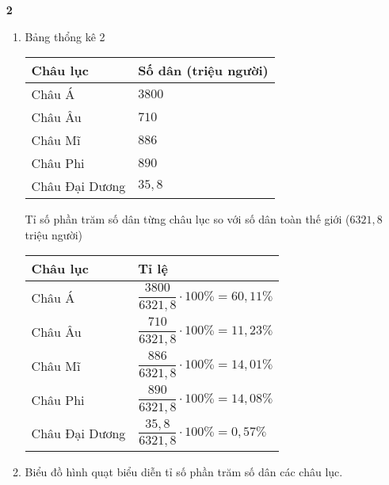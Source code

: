 \begin{vd}
{\begin{itemize}
\begin{enumerate}
				
			\end{enumerate}
		\item[\textbf{2}]
			\begin{enumerate}
				\item Bảng thổng kê 2\\
				\begin{center}
					\begin{tabular}{ | m{3 cm} | m{4 cm}| } 
						\hline
						Châu lục & Số dân (triệu người) \\ 
						\hline
						Châu Á & $3800$ \\ 
						\hline
						Châu Âu & $710$ \\ 
						\hline
						Châu Mĩ & $886$ \\
						\hline
						Châu Phi & $890$ \\
						\hline
						Châu Đại Dương & $35{,}8$ \\
						\hline
					\end{tabular}
				\end{center}
				Tỉ số phần trăm số dân từng châu lục so với số dân toàn thế giới ($6321{,}8$ triệu người)
				\begin{center}
					\begin{tabular}{ | m{3 cm} | m{5 cm}| } 
						\hline
						Châu lục & Tỉ lệ \\ 
						\hline
						Châu Á & $\dfrac{3800}{6321{,}8}\cdot 100\% =60{,}11\%$ \\ 
						\hline
						Châu Âu & $\dfrac{710}{6321{,}8}\cdot 100\% =11{,}23\%$ \\ 
						\hline
						Châu Mĩ & $\dfrac{886}{6321{,}8}\cdot 100\% =14{,}01\%$ \\
						\hline
						Châu Phi & $\dfrac{890}{6321{,}8}\cdot 100\% =14{,}08\%$ \\
						\hline
						Châu Đại Dương & $\dfrac{35{,}8}{6321{,}8}\cdot 100\% =0{,}57\%$ \\
						\hline
					\end{tabular}
				\end{center}
				\item Biểu đồ hình quạt biểu diễn tỉ số phần trăm số dân các châu lục.
				

\end{enumerate}
\end{itemize}}
\end{vd}

